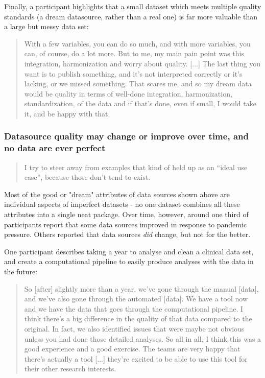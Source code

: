 \documentclass{CUP-JNL-DAP}%
\begin{document}
Finally, a participant highlights that a small dataset which meets multiple quality standards (a dream datasource, rather than a real one) is far more valuable than a large but messy data set:

\blockquote{With a few variables, you can do so much, and with more variables, you can, of course, do a lot more. But to me, my main pain point was this integration, harmonization and worry about quality. [...] The last thing you want is to publish something, and it's not interpreted correctly or it's lacking, or we missed something. That scares me, and so my dream data would be quality in terms of well-done integration, harmonization, standardization, of the data and if that's done, even if small, I would take it, and be happy with that.}

\subsubsection{Datasource quality may change or improve over time, and no data are ever perfect}

\blockquote{I try to steer away from examples that kind of held up as an \enquote{ideal use case}, because those don't tend to exist.}

Most of the good or "dream" attributes of data sources shown above are individual aspects of imperfect datasets - no one dataset combines all these attributes into a single neat package. Over time, however, around one third of participants report that some data sources improved in response to pandemic pressure. Others reported that data sources \textit{did} change, but not for the better. 

One participant describes taking a year to analyse and clean a clinical data set, and create a computational pipeline to easily produce analyses with the data in the future: 

\blockquote{So [after] slightly more than a year, we've gone through the manual [data], and we've also gone through the automated [data]. We have a tool now and we have the data that goes through the computational pipeline. I think there's a big difference in the quality of that data compared to the original. In fact, we also identified issues that were maybe not obvious unless you had done those detailed analyses. So all in all, I think this was a good experience and a good exercise. The teams are very happy that there's actually a tool [...] they're excited to be able to use this tool for their other research interests.}
\end{document}
